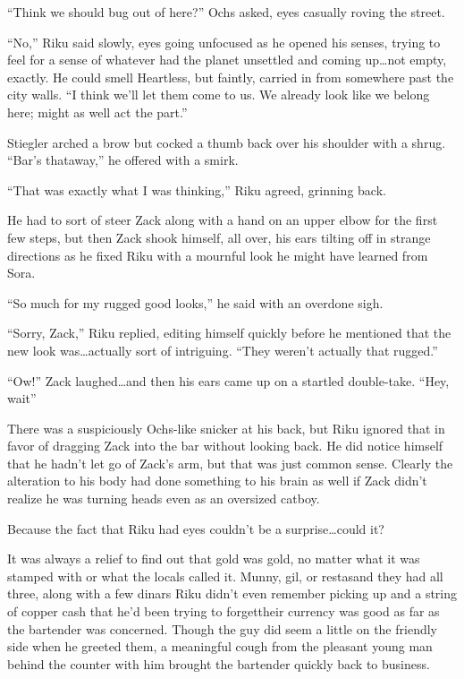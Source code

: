 ``Think we should bug out of here?'' Ochs asked, eyes casually roving the street.

``No,'' Riku said slowly, eyes going unfocused as he opened his senses, trying to feel for a sense of whatever had the planet unsettled and coming up\ldots not empty, exactly. He could smell Heartless, but faintly, carried in from somewhere past the city walls. ``I think we'll let them come to us. We already look like we belong here; might as well act the part.''

Stiegler arched a brow but cocked a thumb back over his shoulder with a shrug. ``Bar's thataway,'' he offered with a smirk.

``That was exactly what I was thinking,'' Riku agreed, grinning back.

He had to sort of steer Zack along with a hand on an upper elbow for the first few steps, but then Zack shook himself, all over, his ears tilting off in strange directions as he fixed Riku with a mournful look he might have learned from Sora.

``So much for my rugged good looks,'' he said with an overdone sigh.

``Sorry, Zack,'' Riku replied, editing himself quickly before he mentioned that the new look was\ldots actually sort of intriguing. ``They weren't actually that rugged.''

``Ow!'' Zack laughed\ldots and then his ears came up on a startled double-take. ``Hey, wait\textemdash ''

There was a suspiciously Ochs-like snicker at his back, but Riku ignored that in favor of dragging Zack into the bar without looking back. He did notice himself that he hadn't let go of Zack's arm, but that was just common sense. Clearly the alteration to his body had done something to his brain as well if Zack didn't realize he was turning heads even as an oversized catboy.

Because the fact that Riku had eyes couldn't be a surprise\ldots could it?

It was always a relief to find out that gold was gold, no matter what it was stamped with or what the locals called it. Munny, gil, or restas\textemdash and they had all three, along with a few dinars Riku didn't even remember picking up and a string of copper cash that he'd been trying to forget\textemdash their currency was good as far as the bartender was concerned. Though the guy did seem a little on the friendly side when he greeted them, a meaningful cough from the pleasant young man behind the counter with him brought the bartender quickly back to business.

